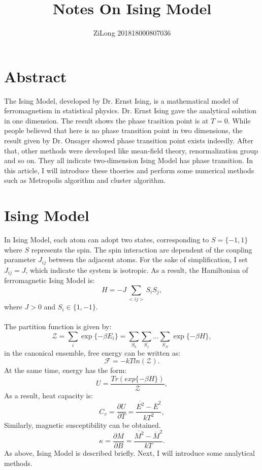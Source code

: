 \documentclass[UTF-8]{article}
\begin{document}
\tableofcontents
\author{ZiLong 201818000807036}
\title{Notes On Ising Model}
\maketitle
\section{Abstract}
The Ising Model, developed by Dr. Ernst Ising, is a mathematical model of ferromagnetism in statistical physics. Dr. Ernst Ising gave the analytical solution in one dimension. The result shows the phase trasition point is at $T=0$. While people believed that here is no phase transition point in two dimensions, the result given by Dr. Onsager showed phase transition point exists indeedly. After that, other methods were developed like mean-field theory, renormalization group and so on. They all indicate two-dimension Ising Model has phase transition. In this article, I will introduce these thoeries and perform some numerical methods such as Metropolis algorithm and cluster algorithm.


\section{Ising Model}
In Ising Model, each atom can adopt two states, corresponding to $S=\{-1,1\}$ where $S$ represents the spin. The spin interaction are dependent of the coupling parameter $J_{ij}$ between the adjacent atoms. For the sake of simplification, I set $J_{ij}=J$, which indicate the system is isotropic. As a result, the Hamiltonian of ferromagnetic Ising Model is:
\begin{equation}
\label{1}
H=-J\sum_{<ij>}S_iS_j,
\end{equation}
where $J>0$ and $S_i\in\{1,-1\}$.\\ \\
The partition function is given by:
\begin{equation}
\label{2}
\mathcal{Z}=\sum_{i}\exp\{-\beta E_i\}=\sum_{S_0}\sum_{S_1}\ldots\sum_{S_N}\exp\{-\beta H\},
\end{equation}
in the canonical ensemble, free energy can be written as:
\begin{equation}
\label{3}
\mathcal{F}=-kTln(\mathcal{Z}).
\end{equation}
At the same time, energy has the form:
\begin{equation}
\label{4}
U=\frac{Tr(exp\{-\beta H\})}{\mathcal{Z}},
\end{equation}
As a result, heat capacity is:
\begin{equation}
C_v=\frac{\partial U}{\partial T}=\frac{\overline{E^2}-\overline{E}^2}{kT^2},
\label{capacity}
\end{equation}
Similarly, magnetic susceptibility can be obtained.
\begin{equation}
\label{mag_sus}
\kappa=\frac{\partial M}{\partial B}=\frac{\overline{M^2}-\overline{M}^2}{kT}.
\end{equation}
As above, Ising Model is described briefly. Next, I will introduce some analytical methods.
\end{document}
